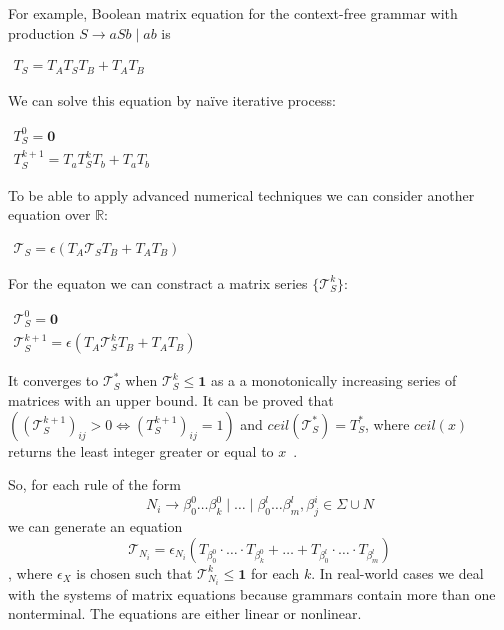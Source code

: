 \documentclass[sigconf]{acmart}
\begin{document}
For example, Boolean matrix equation for the context-free grammar with production $S \rightarrow aSb \mid ab$ is

\begin{center}
\(
\left.
\begin{array}{l}
T_S = T_AT_ST_B + T_AT_B
\end{array}
\right.
\)
\end{center}

We can solve this equation by na\"ive iterative process:
\begin{center}
\(
\left.
\begin{array}{l}
T_S^0 = \mathbf{0} \\
T_S^{k+1} = T_a T_S^k T_b + T_a T_b
\end{array}
\right.
\)
\end{center}

To be able to apply advanced numerical techniques we can consider another equation over $\mathbb{R}$:

\begin{center}
\(
\left.
\begin{array}{l}
\mathcal{T}_S = \epsilon(T_A \mathcal{T}_S T_B + T_A T_B)
\end{array}
\right.
\)
\end{center}

For the equaton we can constract a matrix series $\{ \mathcal{T}_S^{k}\}$:

\begin{center}
\(
\left.
\begin{array}{c}
\mathcal{T}_S^0 = \mathbf{0} \\
\mathcal{T}_S^{k+1} = \epsilon(T_A \mathcal{T}_S^k T_B + T_A T_B)
\end{array}
\right.
\)
\end{center}

It converges to $\mathcal{T}_S^*$ when $\mathcal{T}_S^{k} \leq \textbf{1}$ as a a monotonically increasing series of matrices with an upper bound.
It can be proved that $((\mathcal{T}_S^{k+1})_{ij} > 0 \iff (T_S^{k+1})_{ij} = 1)$ and $ceil(\mathcal{T}_S^*) = T_S^*$, where $ceil(x)$ returns the least integer greater or equal to $x$~\cite{sato2017linear}.

So, for each rule of the form $$N_i \to \beta^0_0 \dots \beta^0_k \mid \ldots \mid \beta^l_0 \dots \beta^l_m, \beta^i_j \in \Sigma \cup N$$ we can generate an equation
$$\mathcal{T}_{N_i} = \epsilon_{N_i}(T_{\beta^0_0}\cdot \ldots \cdot T_{\beta^0_k} + \ldots + T_{\beta^l_0}\cdot \ldots \cdot T_{\beta^l_m}) $$, where $\epsilon_X$ is chosen such that $\mathcal{T}_{N_i}^{k} \leq \textbf{1}$ for each $k$.
In real-world cases we deal with the systems of matrix equations because grammars contain more than one nonterminal.
The equations are either linear or nonlinear.
\end{document}
